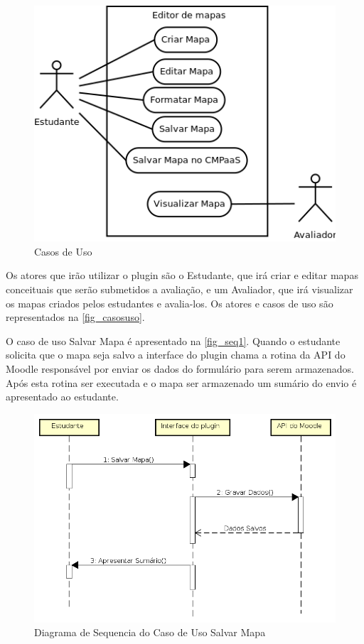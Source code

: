 \documentclass[
	12pt,				%
	openright,			%
	oneside,			%
	a4paper,			%
	english,			%
	french,				%
	spanish,			%
	brazil				%
	]{abntex2}
\begin{document}
\begin{figure}[!h]
	\caption{\label{fig_casosuso} Casos de Uso}
	\begin{center}
		\includegraphics[scale=0.7]{casosuso.png}
	\end{center}
\end{figure} 

Os atores que irão utilizar o plugin são o Estudante, que irá criar e editar mapas conceituais que serão submetidos a avaliação, e um Avaliador, que irá visualizar os mapas criados pelos estudantes e avalia-los. Os atores e casos de uso são representados na \autoref{fig_casosuso}.

O caso de uso Salvar Mapa é apresentado na \autoref{fig_seq1}. Quando o estudante solicita que o mapa seja salvo a interface do plugin chama a rotina da API do Moodle responsável por enviar os dados do formulário para serem armazenados. Após esta rotina ser executada e o mapa ser armazenado um sumário do envio é apresentado ao estudante.

\begin{figure}[htb]
	\caption{\label{fig_seq1} Diagrama de Sequencia do Caso de Uso Salvar Mapa}
	\begin{center}
		\includegraphics[scale=0.5]{SeqDiagramPlugin.png}
	\end{center}
\end{figure} 
\end{document}
